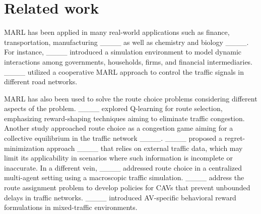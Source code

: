 \section{Related work}
\label{sec:related_work}

MARL has been applied in many real-world applications such as finance, transportation, manufacturing ____ as well as chemistry and biology ____. For instance, ____ introduced a simulation environment to model dynamic interactions among governments, households, firms, and financial intermediaries. ____ utilized a cooperative MARL approach to control the traffic signals in different road networks. 


MARL has also been used to solve the route choice problems considering different aspects of the problem. ____ explored Q-learning for route selection, emphasizing reward-shaping techniques aiming to eliminate traffic congestion. Another study approached route choice as a congestion game aiming for a collective equilibrium in the traffic network ____. ____ proposed a regret-minimization approach ____ that relies on external traffic data, which may limit its applicability in scenarios where such information is incomplete or inaccurate. In a different vein, ____ addressed route choice in a centralized multi-agent setting using a macroscopic traffic simulation. ____ address the route assignment problem to develop policies for CAVs that prevent unbounded delays in traffic networks. ____ introduced AV-specific behavioral reward formulations in mixed-traffic environments.




